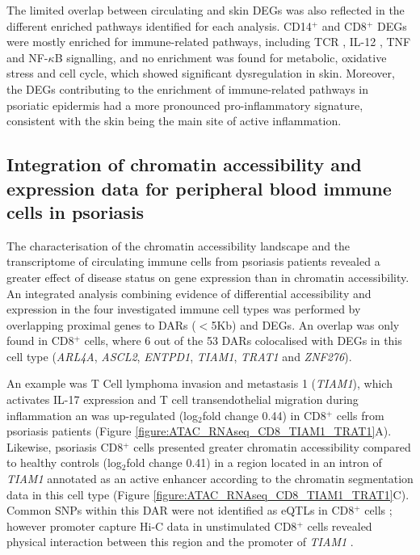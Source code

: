 The limited overlap between circulating and skin DEGs was also reflected in the different enriched pathways identified for each analysis. CD14$^+$ and CD8$^+$ DEGs were mostly enriched for immune-related pathways, including TCR , IL-12 , TNF and NF-$\kappa$B signalling, and no enrichment was found for metabolic, oxidative stress and cell cycle, which showed significant dysregulation in skin. %
Moreover, the DEGs contributing to the enrichment of immune-related pathways in psoriatic epidermis had a more pronounced pro-inflammatory signature, consistent with the skin being the main site of active inflammation.


\subsection{Integration of chromatin accessibility and expression data for peripheral blood immune cells in psoriasis}
The characterisation of the chromatin accessibility landscape and the transcriptome of circulating immune cells from psoriasis patients revealed a greater effect of disease status on gene expression than in chromatin accessibility. An integrated analysis combining evidence of differential accessibility and expression in the four investigated immune cell types was performed by overlapping proximal genes to DARs ($<$5Kb) and DEGs. An overlap was only found in CD8$^+$ cells, where 6 out of the 53 DARs colocalised with DEGs in this cell type (\textit{ARL4A}, \textit{ASCL2}, \textit{ENTPD1}, \textit{TIAM1}, \textit{TRAT1} and \textit{ZNF276}).

An example was T Cell lymphoma invasion and metastasis 1 (\textit{TIAM1}), which activates IL-17 expression and T cell transendothelial migration during inflammation \parencite{Kurdi2016, Gerard2009} an was up-regulated (log$_2$fold change 0.44) in CD8$^+$ cells from psoriasis patients (Figure \ref{figure:ATAC_RNAseq_CD8_TIAM1_TRAT1}A). Likewise, psoriasis CD8$^+$ cells presented greater chromatin accessibility compared to healthy controls (log$_2$fold change 0.41) in a region located in an intron of \textit{TIAM1} annotated as an active enhancer according to the chromatin segmentation data in this cell type (Figure \ref{figure:ATAC_RNAseq_CD8_TIAM1_TRAT1}C). Common SNPs within this DAR were not identified as eQTLs in CD8$^+$ cells \parencite{Kasela2017}; however promoter capture Hi-C data in unstimulated CD8$^+$ cells revealed physical interaction between this region and the promoter of \textit{TIAM1} \parencite{Javierre2016}. 

